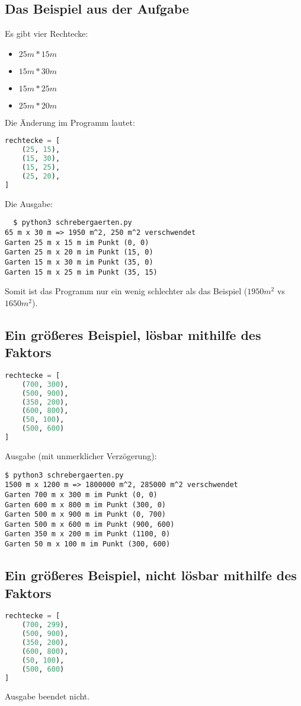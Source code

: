 \documentclass[a4paper,10pt,ngerman]{scrartcl}
\begin{document}
\subsection{Das Beispiel aus der Aufgabe}
Es gibt vier Rechtecke: 
\begin{itemize}
  \item $25m*15m$
  \item $15m*30m$
  \item $15m*25m$
  \item $25m*20m$
\end{itemize}
Die Änderung im Programm lautet:
\begin{lstlisting}[language=Python]
rechtecke = [
    (25, 15),
    (15, 30),
    (15, 25),
    (25, 20),
]
\end{lstlisting}
Die Ausgabe:
\begin{lstlisting}
  $ python3 schrebergaerten.py
65 m x 30 m => 1950 m^2, 250 m^2 verschwendet
Garten 25 m x 15 m im Punkt (0, 0)
Garten 25 m x 20 m im Punkt (15, 0)
Garten 15 m x 30 m im Punkt (35, 0)
Garten 15 m x 25 m im Punkt (35, 15)
\end{lstlisting}

Somit ist das Programm nur ein wenig schlechter als das Beispiel ($1950m^2$ vs $1650m^2$).


\subsection{Ein größeres Beispiel, lösbar mithilfe des Faktors}
\label{faktor-loesbar}

\begin{lstlisting}[language=Python]
rechtecke = [
    (700, 300),
    (500, 900),
    (350, 200),
    (600, 800),
    (50, 100),
    (500, 600)
]
\end{lstlisting}
Ausgabe (mit unmerklicher Verzögerung):
\begin{lstlisting}
$ python3 schrebergaerten.py
1500 m x 1200 m => 1800000 m^2, 285000 m^2 verschwendet
Garten 700 m x 300 m im Punkt (0, 0)
Garten 600 m x 800 m im Punkt (300, 0)
Garten 500 m x 900 m im Punkt (0, 700)
Garten 500 m x 600 m im Punkt (900, 600)
Garten 350 m x 200 m im Punkt (1100, 0)
Garten 50 m x 100 m im Punkt (300, 600)
\end{lstlisting}

\subsection{Ein größeres Beispiel, nicht lösbar mithilfe des Faktors}
\label{faktor-nicht-loesbar}
\begin{lstlisting}[language=Python]
rechtecke = [
    (700, 299),
    (500, 900),
    (350, 200),
    (600, 800),
    (50, 100),
    (500, 600)
]
\end{lstlisting}
Ausgabe beendet nicht.
\end{document}
